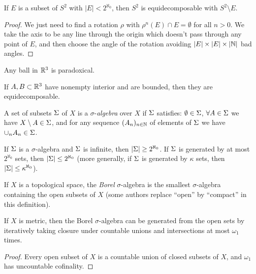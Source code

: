 \begin{prop} If $E$ is a subset of $S^2$ with $|E| < 2^{\aleph_0}$, then $S^2$ is equidecomposable with $S^2\setminus E$.
\end{prop}
\begin{proof} We just need to find a rotation $\rho$ with $\rho^n(E) \cap E = \emptyset$ for all $n > 0$. We take the axis to be any line through the origin which doesn't pass through any point of $E$, and then choose the angle of the rotation avoiding $|E|\times|E|\times|\mathbb{N}|$ bad angles.
\end{proof}

\begin{cor} Any ball in $\mathbb{R}^3$ is paradoxical.
\end{cor}

\begin{cor} If $A, B \subset \mathbb{R}^3$ have nonempty interior and are bounded, then they are equidecomposable.
\end{cor}


\begin{defn} A set of subsets $\Sigma$ of $X$ is a $\sigma$-\emph{algebra} over $X$ if $\Sigma$ satisfies: $\emptyset \in \Sigma$, $\forall A \in \Sigma$ we have $X\setminus A \in \Sigma$, and for any sequence $(A_n)_{n \in \mathbb{N}}$ of elements of $\Sigma$ we have $\cup_n A_n \in \Sigma$.
\end{defn}

\begin{prop} If $\Sigma$ is a $\sigma$-algebra and $\Sigma$ is infinite, then $|\Sigma| \ge 2^{\aleph_0}$. If $\Sigma$ is generated by at most $2^{\aleph_0}$ sets, then $|\Sigma| \le 2^{\aleph_0}$ (more generally, if $\Sigma$ is generated by $\kappa$ sets, then $|\Sigma| \le \kappa^{\aleph_0}$).
\end{prop}

\begin{defn} If $X$ is a topological space, the \emph{Borel} $\sigma$-algebra is the smallest $\sigma$-algebra containing the open subsets of $X$ (some authors replace ``open'' by ``compact'' in this definition).
\end{defn}

\begin{prop} If $X$ is metric, then the Borel $\sigma$-algebra can be generated from the open sets by iteratively taking closure under countable unions and intersections at most $\omega_1$ times.
\end{prop}
\begin{proof} Every open subset of $X$ is a countable union of closed subsets of $X$, and $\omega_1$ has uncountable cofinality.
\end{proof}

